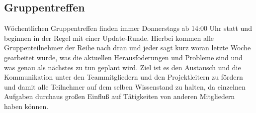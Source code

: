 \subsection{Gruppentreffen}
Wöchentlichen Gruppentreffen finden immer Donnerstags ab 14:00 Uhr statt und beginnen in der Regel mit einer Update-Runde. Hierbei kommen alle Gruppenteilnehmer der Reihe nach dran und jeder sagt kurz woran letzte Woche gearbeitet wurde, was die aktuellen Herausfoderungen und Probleme sind und was genau als nächstes zu tun geplant wird. Ziel ist es den Austausch und die Kommunikation unter den Teammitgliedern und den Projektleitern zu fördern und damit alle Teilnehmer auf dem selben Wissenstand zu halten, da einzelnen Aufgaben durchaus großen Einfluß auf Tätigkeiten von anderen Mitgliedern haben können. \\
